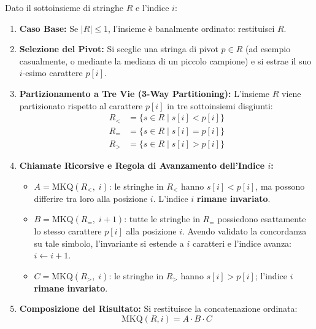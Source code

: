Dato il sottoinsieme di stringhe $R$ e l'indice $i$:
\begin{enumerate}
  \item \textbf{Caso Base:} Se $|R| \le 1$, l'insieme \`e banalmente ordinato: restituisci $R$.
  \item \textbf{Selezione del Pivot:} Si sceglie una stringa di pivot $p \in R$ (ad esempio casualmente, o mediante la mediana di un piccolo campione) e si estrae il suo $i$-esimo carattere $p[i]$.
  \item \textbf{Partizionamento a Tre Vie (3-Way Partitioning):} L'insieme $R$ viene partizionato rispetto al carattere $p[i]$ in tre sottoinsiemi disgiunti:
  \begin{align}
    R_< &= \{ s \in R \mid s[i] < p[i] \} \\
    R_= &= \{ s \in R \mid s[i] = p[i] \} \\
    R_> &= \{ s \in R \mid s[i] > p[i] \}
  \end{align}
  \item \textbf{Chiamate Ricorsive e Regola di Avanzamento dell'Indice $i$:}
  \begin{itemize}
    \item $A = \text{MKQ}(R_<, \; i)$: le stringhe in $R_<$ hanno $s[i] < p[i]$, ma possono differire tra loro alla posizione $i$. L'indice $i$ \textbf{rimane invariato}.
    \item $B = \text{MKQ}(R_=, \; i + 1)$: tutte le stringhe in $R_=$ possiedono esattamente lo stesso carattere $p[i]$ alla posizione $i$. Avendo validato la concordanza su tale simbolo, l'invariante si estende a $i$ caratteri e l'indice avanza: \textbf{$i \leftarrow i + 1$}.
    \item $C = \text{MKQ}(R_>, \; i)$: le stringhe in $R_>$ hanno $s[i] > p[i]$; l'indice $i$ \textbf{rimane invariato}.
  \end{itemize}
  \item \textbf{Composizione del Risultato:} Si restituisce la concatenazione ordinata:
  \begin{equation}
    \text{MKQ}(R, i) = A \cdot B \cdot C
  \end{equation}
\end{enumerate}

